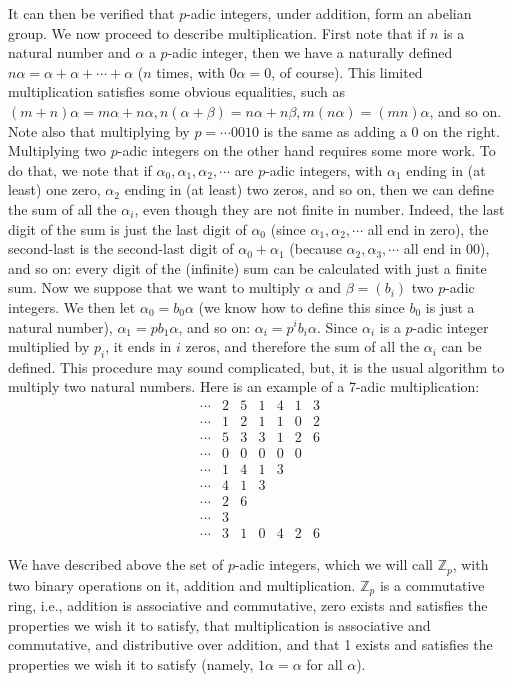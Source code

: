 \documentclass{llncs}
\begin{document}
It can then be verified that $p$-adic integers, under addition, form an abelian
group.
We now proceed to describe multiplication. First note that if $n$ is a natural
number and $\alpha $ a $p$-adic integer, then we have a naturally defined $n\alpha  = \alpha +\alpha + \cdots +\alpha $
($n$ times, with $0\alpha  = 0$, of course).  This limited multiplication satisfies some obvious equalities, such as
$(m + n)\alpha = m\alpha  + n\alpha , n(\alpha  + \beta) = n\alpha  + n\beta , m(n\alpha ) = (mn)\alpha $, and so on. 
Note also that multiplying by $p = \cdots 0010$ is the same as adding a $0$
on the right.
Multiplying two $p$-adic integers on the other hand requires some more work.
To do that, we note that if $\alpha _0, \alpha _1, \alpha _2, \cdots $  are $p$-adic integers, with $\alpha _1$ ending in (at
least) one zero, $\alpha _2$ ending in (at least) two zeros, and so on, then we can define
the sum of all the $\alpha _i$, even though they are not finite in number. Indeed, the last
digit of the sum is just the last digit of $\alpha _0$ (since $\alpha _1, \alpha _2, \cdots $ all end in zero), the
second-last is the second-last digit of $\alpha _0 + \alpha _1$ (because $\alpha _2, \alpha _3, \cdots $ all end in 00),
and so on: every digit of the (infinite) sum can be calculated with just a finite sum.
Now we suppose that we want to multiply $\alpha $ and $\beta  = (b_i)$ two $p$-adic integers. We
then let $\alpha _0 = b_0\alpha $ (we know how to define this since $b_0$ is just a natural number),
$\alpha _1 = pb_1\alpha $, and so on: $\alpha _i = p^ib_i\alpha $. Since $\alpha _i$ is a $p$-adic integer multiplied by $p_i$, it
ends in $i$ zeros, and therefore the sum of all the $\alpha _i$ can be defined.
This procedure may sound complicated, but,  it is the usual algorithm
 to multiply two natural numbers. Here
is an example of a 7-adic multiplication:
$$
\begin{array}{rrrrrrrr|}
\cdots &2&5&1&4&1&3\\
\cdots & 1& 2 &1& 1 & 0& 2\\
\hline
\cdots &5& 3& 3& 1& 2 & 6 \\
\cdots &0&0& 0&0&0& \\
\cdots &1&4&1&3&&\\
\cdots &4&1&3&&&\\
\cdots &2&6&&&&\\
\cdots &3&&&&&\\
\hline
\cdots &3&1&0&4&2&6
\end{array}
$$

We  have described above the set of $p$-adic integers, which we will call $\mathbb{Z}_p$, with two binary
operations on it, addition and multiplication. $\mathbb{Z}_p$ is a commutative ring, i.e., 
addition is associative and commutative,  zero exists
and satisfies the properties we wish it to satisfy, that multiplication is associative
and commutative, and distributive over addition, and that 1 exists and satisfies the
properties we wish it to satisfy (namely, $1\alpha  = \alpha $   for all    $\alpha $).
\end{document}
